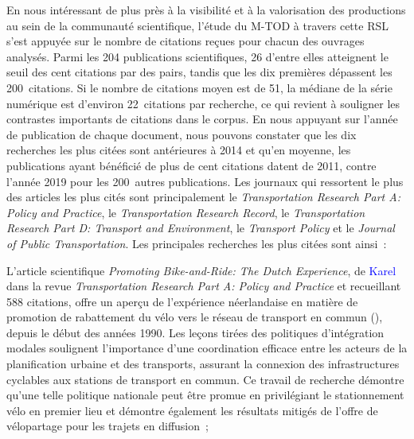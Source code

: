 \begin{refsegment}
En nous intéressant de plus près à la visibilité et à la valorisation des productions au sein de la communauté scientifique, l'étude du \acrshort{M-TOD} à travers cette \acrshort{RSL} s'est appuyée sur le nombre de citations reçues pour chacun des ouvrages analysés. Parmi les 204 publications scientifiques, 26 d'entre elles atteignent le seuil des cent citations par des pairs, tandis que les dix premières dépassent les 200~citations. Si le nombre de citations moyen est de 51, la médiane de la série numérique est d'environ 22~citations par recherche, ce qui revient à souligner les contrastes importants de citations dans le corpus. En nous appuyant sur l'année de publication de chaque document, nous pouvons constater que les dix recherches les plus citées sont antérieures à 2014 et qu'en moyenne, les publications ayant bénéficié de plus de cent citations datent de 2011, contre l'année 2019 pour les 200~autres publications. Les journaux qui ressortent le plus des articles les plus cités sont principalement le \foreignlanguage{english}{\textsl{Transportation Research Part A: Policy and Practice}}, le \textsl{Transportation Research Record}, le \foreignlanguage{english}{\textsl{Transportation Research Part D: Transport and Environment}}, le \textsl{Transport Policy} et le \textsl{Journal of Public Transportation}. Les principales recherches les plus citées sont ainsi~:
    \begin{customitemize}
\item L'article scientifique \foreignlanguage{english}{\textsl{Promoting Bike-and-Ride: The Dutch Experience}}, de \textcolor{blue}{Karel} \textcolor{blue}{\textcite[328, 330, 335]{martens_promoting_2007}} dans la revue \foreignlanguage{english}{\textsl{Transportation Research Part A: Policy and Practice}} et recueillant 588 citations, offre un aperçu de l'expérience néerlandaise en matière de promotion de rabattement du vélo vers le réseau de transport en commun (), depuis le début des années 1990. Les leçons tirées des politiques d'intégration modales soulignent l'importance d'une coordination efficace entre les acteurs de la planification urbaine et des transports, assurant la connexion des infrastructures cyclables aux stations de transport en commun. Ce travail de recherche démontre qu'une telle politique nationale peut être promue en privilégiant le stationnement vélo en premier lieu et démontre également les résultats mitigés de l'offre de vélopartage pour les trajets en diffusion~;

\end{customitemize}
\end{refsegment}
